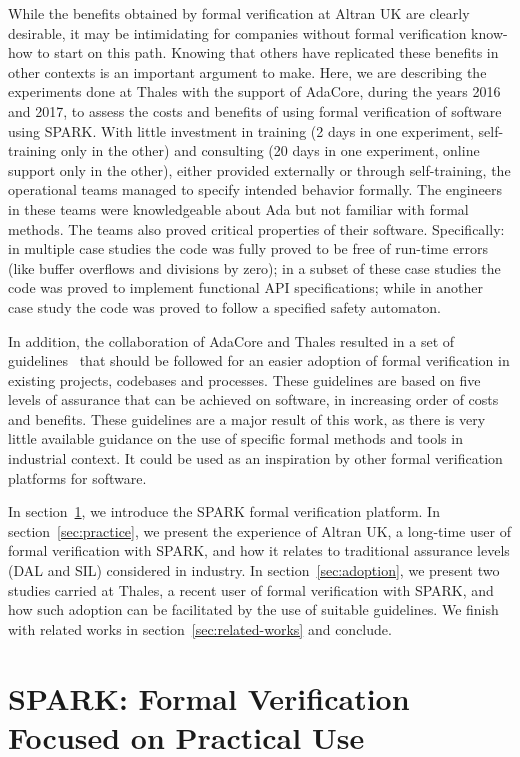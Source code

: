 \documentclass{eceasst}
\begin{document}
While the benefits obtained by formal verification at Altran UK are clearly
desirable, it may be intimidating for companies without formal verification
know-how to start on this path. Knowing that others have replicated these
benefits in other contexts is an important argument to make.  Here, we are
describing the experiments done at Thales with the support of AdaCore,
during the years 2016 and 2017, to
assess the costs and benefits of using formal verification of software using
SPARK. With little investment in training (2 days in one experiment, self-training
only in the other) and consulting (20 days in one experiment, online support only
in the other), either provided
externally or through self-training, the operational teams managed to specify
intended behavior formally. The engineers in these teams were knowledgeable
about Ada but not familiar with formal methods.
The teams also proved critical
properties of their software. Specifically: in multiple case studies the code was
fully proved to be free of run-time errors (like buffer overflows and divisions
by zero); in a subset of these case studies the code was proved to implement
functional API specifications; while in another case study the code was proved to
follow a specified safety automaton.

In addition, the collaboration of AdaCore and Thales resulted in a set of
guidelines~\cite{AdaCoreThalesSPARK} that should be followed for an easier
adoption of formal verification in existing projects, codebases and
processes. These guidelines are based on five levels of assurance that can be
achieved on software, in increasing order of costs and benefits. These
guidelines are a major result of this work, as there is very little available
guidance on the use of specific formal methods and tools in industrial
context. It could be used as an inspiration by other formal verification
platforms for software.

In section~\ref{sec:SPARK}, we introduce the SPARK formal verification
platform. In section~\ref{sec:practice}, we present the experience of Altran
UK, a long-time user of formal verification with SPARK, and how it relates to
traditional assurance levels (DAL and SIL) considered in industry. In
section~\ref{sec:adoption}, we present two studies carried at Thales, a recent
user of formal verification with SPARK, and how such adoption can be
facilitated by the use of suitable guidelines. We finish with related works in
section~\ref{sec:related-works} and conclude.

\section{SPARK: Formal Verification Focused on Practical Use}
\label{sec:SPARK}
\end{document}
